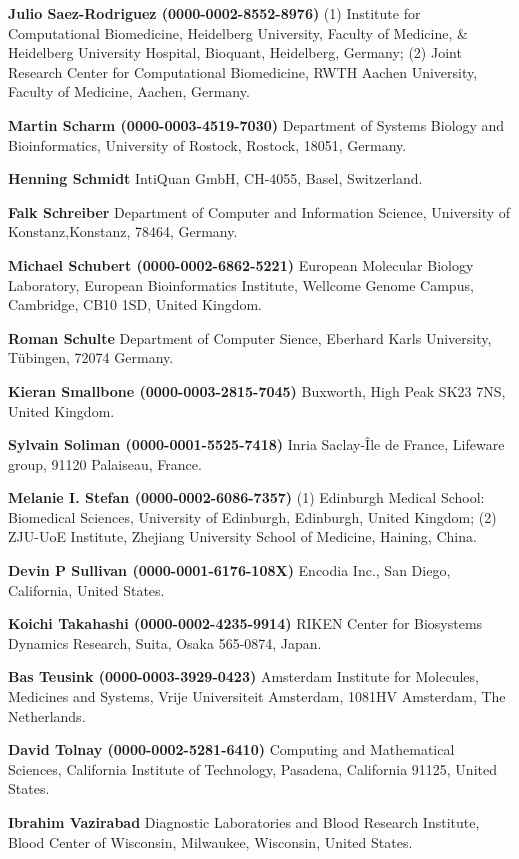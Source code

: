 \documentclass{sbml-paper}
\begin{document}
\textbf{Julio Saez-Rodriguez (0000-0002-8552-8976)} (1) Institute for Computational Biomedicine, Heidelberg University, Faculty of Medicine, \& Heidelberg University Hospital, Bioquant, Heidelberg, Germany; (2) Joint Research Center for Computational Biomedicine, RWTH Aachen University, Faculty of Medicine, Aachen, Germany.

\textbf{Martin Scharm (0000-0003-4519-7030)} Department of Systems Biology and Bioinformatics, University of Rostock, Rostock, 18051, Germany.

\textbf{Henning Schmidt} IntiQuan GmbH, CH-4055, Basel, Switzerland.

\textbf{Falk Schreiber} Department of Computer and Information Science, University of Konstanz,Konstanz, 78464, Germany.

\textbf{Michael Schubert (0000-0002-6862-5221)} European Molecular Biology Laboratory, European Bioinformatics Institute, Wellcome Genome Campus, Cambridge, CB10 1SD, United Kingdom.

\textbf{Roman Schulte} Department of Computer Sience, Eberhard Karls University, Tübingen, 72074 Germany.

\textbf{Kieran Smallbone (0000-0003-2815-7045)} Buxworth, High Peak SK23 7NS, United Kingdom.

\textbf{Sylvain Soliman (0000-0001-5525-7418)} Inria Saclay-Île de France, Lifeware group, 91120 Palaiseau, France.

\textbf{Melanie I. Stefan (0000-0002-6086-7357)} (1) Edinburgh Medical School: Biomedical Sciences, University of Edinburgh, Edinburgh, United Kingdom; (2) ZJU-UoE Institute, Zhejiang University School of Medicine, Haining, China.

\textbf{Devin P Sullivan (0000-0001-6176-108X)} Encodia Inc., San Diego, California, United States.

\textbf{Koichi Takahashi (0000-0002-4235-9914)} RIKEN Center for Biosystems Dynamics Research, Suita, Osaka 565-0874, Japan.

\textbf{Bas Teusink (0000-0003-3929-0423)} Amsterdam Institute for Molecules, Medicines and Systems, Vrije Universiteit Amsterdam, 1081HV Amsterdam, The Netherlands.

\textbf{David Tolnay (0000-0002-5281-6410)} Computing and Mathematical Sciences, California Institute of Technology, Pasadena, California 91125, United States.

\textbf{Ibrahim Vazirabad} Diagnostic Laboratories and Blood Research Institute, Blood Center of Wisconsin, Milwaukee, Wisconsin, United States.
\end{document}
